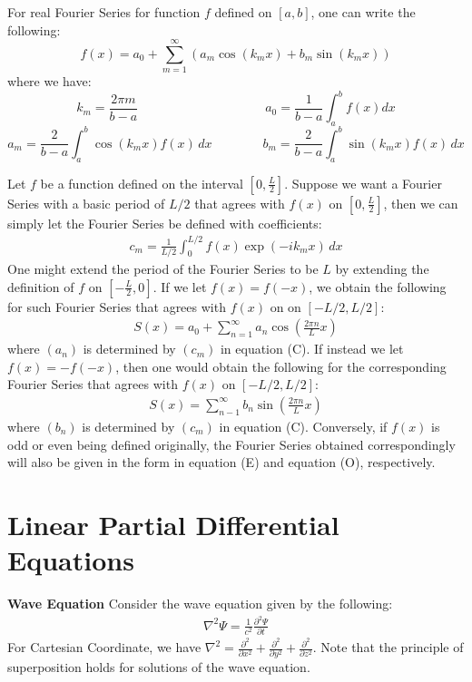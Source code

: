 \documentclass[11pt]{article}
\theoremstyle{break}
\theoremstyle{break}
\begin{document}
For real Fourier Series for function $f$ defined on $[a,b]$, one can write the following:
$$f(x) = a_0 + \sum_{m=1}^\infty \left(a_m \cos(k_mx) + b_m \sin(k_mx)\right)$$
where we have:
$$k_m = \frac{2\pi m}{b-a}\qquad\qquad\qquad\qquad\qquad a_0 = \frac{1}{b-a}\int_a^b f(x) dx$$
$$ a_m = \frac{2}{b-a}\int_a^b \cos(k_m x) f(x) \, dx \qquad\qquad b_m = \frac{2}{b-a}\int_a^b \sin(k_mx)f(x)\, dx$$

Let $f$ be a function defined on the interval $[0,\frac{L}{2}]$. Suppose we want a Fourier Series with a basic period of $L/2$ that agrees with $f(x)$ on $[0,\frac{L}{2}]$, then we can simply let the Fourier Series be defined with coefficients:
\begin{align*}
c_m = \frac{1}{L/2}\int_0^{L/2} f(x) \exp(-ik_mx)\, dx \tag{C}
\end{align*}
One might extend the period of the Fourier Series to be $L$ by extending the definition of $f$ on $[-\frac{L}{2}, 0]$. If we let $f(x) = f(-x)$, we obtain the following for such Fourier Series that agrees with $f(x)$ on on $[-L/2, L/2]$:
\begin{align*}
S(x) = a_0 + \sum_{n=1}^\infty a_n \cos\left(\frac{2\pi n}{L}x\right) \tag{E}
\end{align*}
where $(a_n)$ is determined by $(c_m)$ in equation (C). If instead we let $f(x) = -f(-x)$, then one would obtain the following for the corresponding Fourier Series that agrees with $f(x)$ on $[-L/2, L/2]$:
\begin{align*}
S(x) = \sum_{n-1}^\infty b_n \sin\left( \frac{2\pi n}{L}x\right) \tag{O}
\end{align*}
where $(b_n)$ is determined by $(c_m)$ in equation (C). Conversely, if $f(x)$ is odd or even being defined originally, the Fourier Series obtained correspondingly will also be given in the form in equation (E) and equation (O), respectively.

\newpage
\section{Linear Partial Differential Equations}

\textbf{Wave Equation}
Consider the wave equation given by the following:
\begin{align*}
\nabla^2 \Psi = \frac{1}{c^2}\frac{\partial^2 \Psi}{\partial t}
\end{align*}
For Cartesian Coordinate, we have $\nabla^2=\frac{\partial^2}{\partial x^2}+\frac{\partial^2}{\partial y^2}+\frac{\partial^2}{\partial z^2}$. Note that the principle of superposition holds for solutions of the wave equation.\\
\end{document}
